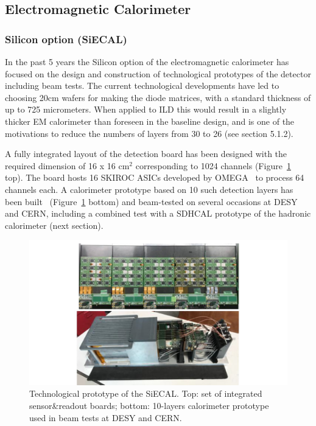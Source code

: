 \subsection{Electromagnetic Calorimeter}

\subsubsection{Silicon option (SiECAL)}

In the past 5 years the Silicon option of the electromagnetic calorimeter has focused on the design and construction of technological prototypes of the detector including beam tests. The current technological developments have led to choosing 20cm wafers for making the diode matrices, with a standard thickness of up to 725 micrometers. When applied to ILD this would result in a slightly thicker EM calorimeter than foreseen in the baseline design, and is one of the motivations to reduce the numbers of layers from 30 to 26 (see section 5.1.2).

A fully integrated layout of the detection board has been designed with the required dimension of 16 x 16 cm$^2$ corresponding to 1024 channels (Figure~\ref{fig:det:SiWECAL_proto} top). The board hosts 16 SKIROC ASICs developed by OMEGA~\cite{Callier:2011zz,Suehara:2018mqk} to process 64 channels each. A calorimeter prototype based on 10 such detection layers has been built~\cite{Boudry:2014bxa,Poeschl:2015jma} (Figure~\ref{fig:det:SiWECAL_proto} bottom) and beam-tested on several occasions at DESY and CERN, including a combined test with a SDHCAL prototype of the hadronic calorimeter (next section).   
\begin{figure}[t!]
\centering
\includegraphics[width=1.0\hsize]{Detector/fig/SiWECAL_proto.jpg}
\caption{Technological prototype of the SiECAL. Top: set of integrated sensor\&readout boards; bottom: 10-layers calorimeter prototype used in beam tests at DESY and CERN.}
\label{fig:det:SiWECAL_proto}
\end{figure}

